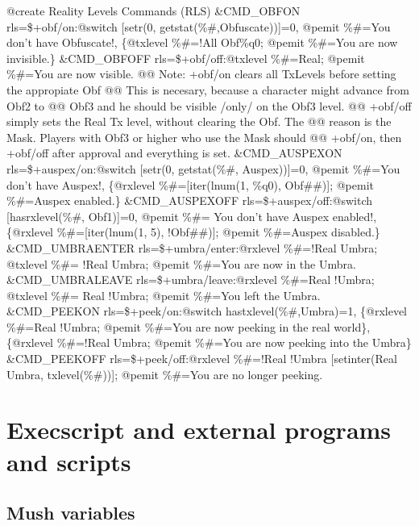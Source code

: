 \documentclass[letterpaper,10pt,english]{sphinxmanual}
\begin{document}
\sphinxAtStartPar
@create Reality Levels Commands (RLS)
\&CMD\_OBFON rls=\$+obf/on:@switch {[}setr(0, getstat(\%\#,Obfuscate)){]}=0, @pemit
\%\#=You don’t have Obfuscate!, \{@txlevel \%\#=!All Obf\%q0; @pemit \%\#=You are
now invisible.\}
\&CMD\_OBFOFF rls=\$+obf/off:@txlevel \%\#=Real; @pemit \%\#=You are now visible.
@@ Note: +obf/on clears all TxLevels before setting the appropiate Obf
@@ This is necesary, because a character might advance from Obf2 to
@@ Obf3 and he should be visible /only/ on the Obf3 level.
@@ +obf/off simply sets the Real Tx level, without clearing the Obf. The
@@ reason is the Mask. Players with Obf3 or higher who use the Mask should
@@ +obf/on, then +obf/off after approval and everything is set.
\&CMD\_AUSPEXON rls=\$+auspex/on:@switch {[}setr(0, getstat(\%\#, Auspex)){]}=0,
@pemit \%\#=You don’t have Auspex!, \{@rxlevel \%\#={[}iter(lnum(1, \%q0), Obf\#\#){]};
@pemit \%\#=Auspex enabled.\}
\&CMD\_AUSPEXOFF rls=\$+auspex/off:@switch {[}hasrxlevel(\%\#, Obf1){]}=0, @pemit \%\#=
You don’t have Auspex enabled!, \{@rxlevel \%\#={[}iter(lnum(1, 5), !Obf\#\#){]};
@pemit \%\#=Auspex disabled.\}
\&CMD\_UMBRAENTER rls=\$+umbra/enter:@rxlevel \%\#=!Real Umbra; @txlevel \%\#=
!Real Umbra; @pemit \%\#=You are now in the Umbra.
\&CMD\_UMBRALEAVE rls=\$+umbra/leave:@rxlevel \%\#=Real !Umbra; @txlevel \%\#=
Real !Umbra; @pemit \%\#=You left the Umbra.
\&CMD\_PEEKON rls=\$+peek/on:@switch hastxlevel(\%\#,Umbra)=1, \{@rxlevel \%\#=Real
!Umbra; @pemit \%\#=You are now peeking in the real world\}, \{@rxlevel \%\#=!Real
Umbra; @pemit \%\#=You are now peeking into the Umbra\}
\&CMD\_PEEKOFF rls=\$+peek/off:@rxlevel \%\#=!Real !Umbra {[}setinter(Real Umbra,
txlevel(\%\#)){]}; @pemit \%\#=You are no longer peeking.


\chapter{Execscript and external programs and scripts}
\label{\detokenize{20-execscript:execscript-and-external-programs-and-scripts}}\label{\detokenize{20-execscript::doc}}

\section{Mush variables}
\label{\detokenize{20-execscript:mush-variables}}
\end{document}
